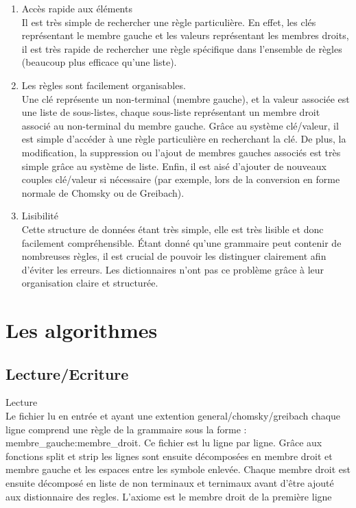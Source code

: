\documentclass{rapport}
\begin{document}
\begin{enumerate}
\item Accès rapide aux éléments \\
Il est très simple de rechercher une règle particulière. En effet, les clés représentant le membre gauche et les valeurs représentant les membres droits, il est très rapide de rechercher une règle spécifique dans l'ensemble de règles (beaucoup plus efficace qu'une liste).

\item Les règles sont facilement organisables. \\ Une clé représente un non-terminal (membre gauche), et la valeur associée est une liste de sous-listes, chaque sous-liste représentant un membre droit associé au non-terminal du membre gauche. Grâce au système clé/valeur, il est simple d’accéder à une règle particulière en recherchant la clé. De plus, la modification, la suppression ou l’ajout de membres gauches associés est très simple grâce au système de liste. Enfin, il est aisé d'ajouter de nouveaux couples clé/valeur si nécessaire (par exemple, lors de la conversion en forme normale de Chomsky ou de Greibach).\\

\item Lisibilité\\
Cette structure de données étant très simple, elle est très lisible et donc facilement compréhensible. Étant donné qu’une grammaire peut contenir de nombreuses règles, il est crucial de pouvoir les distinguer clairement afin d’éviter les erreurs. Les dictionnaires n’ont pas ce problème grâce à leur organisation claire et structurée. \\

\end{enumerate}

\section{Les algorithmes}

\subsection{Lecture/Ecriture}
Lecture \\
Le fichier lu en entrée et ayant une extention general/chomsky/greibach chaque ligne comprend une règle de la grammaire sous la forme :  membre_gauche:membre_droit. Ce fichier est lu ligne par ligne. Grâce aux fonctions split et strip les lignes sont ensuite  décomposées en membre droit et membre gauche et les espaces entre les symbole enlevée. Chaque membre droit est ensuite décomposé en liste de non terminaux et ternimaux avant d'être ajouté aux distionnaire des regles. L'axiome est le membre droit de la première ligne\\
\end{document}
